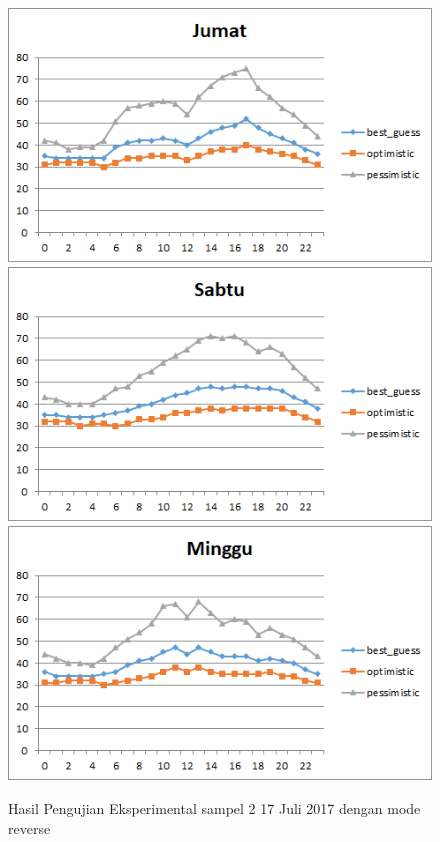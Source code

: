 \begin{figure}[H]
				\centering		
				\includegraphics[]{Gambar/jumatsampel217072017reverse.png}
				\includegraphics[]{Gambar/sabtusampel217072017reverse.png}
				\includegraphics[]{Gambar/minggusampel217072017reverse.png}
				\caption[Hasil Pengujian Eksperimental]{Hasil Pengujian Eksperimental sampel 2 17 Juli 2017 dengan mode reverse}
				\label{fig:eksperimentalsampel217072017reverse}
\end{figure}


